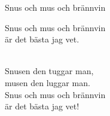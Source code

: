 \begin{song}{Snus och mus och brännvin}

	
	\begin{repetition}
		Snus och mus och brännvin\\
		är det bästa jag vet.
	\end{repetition}\\
	Snusen den tuggar man,\\
	musen den luggar man.\\
	Snus och mus och brännvin\\
	är det bästa jag vet!
	
\end{song}
